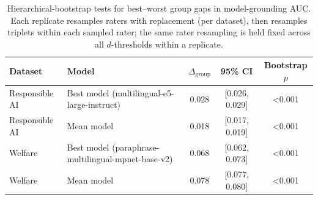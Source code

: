 \begin{table}[t]
\centering
\small
\caption{Hierarchical-bootstrap tests for best--worst group gaps in model-grounding AUC. Each replicate resamples raters with replacement (per dataset), then resamples triplets within each sampled rater; the same rater resampling is held fixed across all $d$-thresholds within a replicate.}
\label{tab:group-gap-tests}
\begin{tabular}{llccc}
\toprule
\textbf{Dataset} & \textbf{Model} & $\Delta_{\mathrm{group}}$ & \textbf{95\% CI} & \textbf{Bootstrap $p$} \\
\midrule
Responsible AI & Best model (multilingual-e5-large-instruct) & 0.028 & [0.026, 0.029] & <0.001 \\
Responsible AI & Mean model & 0.018 & [0.017, 0.019] & <0.001 \\
Welfare & Best model (paraphrase-multilingual-mpnet-base-v2) & 0.068 & [0.062, 0.073] & <0.001 \\
Welfare & Mean model & 0.078 & [0.077, 0.080] & <0.001 \\
\bottomrule
\end{tabular}
\end{table}
